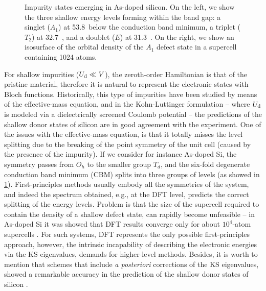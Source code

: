 \begin{figure}
    \centering
    \caption[]{Impurity states emerging in As-doped silicon. On the left, we show the three shallow energy levels forming within the band gap: a singlet ($A_1$) at 53.8~\mev below the conduction band minimum, a triplet ($T_2$) at 32.7~\mev, and a doublet ($E$) at 31.3~\mev. On the right, we show an isosurface of the orbital density of the $A_1$ defect state in a supercell containing 1024 atoms.}
    \label{fig:as-si-defect}
\end{figure}

For shallow impurities ($U_{\rm d} \ll V$), the zeroth-order Hamiltonian is that of the pristine material, therefore it is natural to represent the electronic states with Bloch functions. Historically, this type of impurities have been studied by means of the effective-mass equation, and in the Kohn-Luttinger formulation \cite{kohn_theory_1955} -- where $U_{\rm d}$ is modeled via a dielectrically screened Coulomb potential -- the predictions of the shallow donor states of silicon are in good agreement with the experiment. One of the issues with the effective-mass equation, is that it totally misses the level splitting due to the breaking of the point symmetry of the unit cell (caused by the presence of the impurity). If we consider for instance As-doped Si, the symmetry passes from $O_h$ to the smaller group $T_d$, and the six-fold degenerate conduction band minimum (CBM) splits into three groups of levels (as showed in \cref{fig:as-si-defect}). First-principles methods usually embody all the symmetries of the system, and indeed the spectrum obtained, e.g., at the DFT level, predicts the correct splitting of the energy levels. Problem is that the size of the supercell required to contain the density of a shallow defect state, can rapidly become unfeasible -- in As-doped Si it was showed that DFT results converge only for about $10^4$-atom supercells \cite{yamamoto_first-principles_2009}. For such systems, DFT represents the only possible first-principles approach, however, the intrinsic incapability of describing the electronic energies via the KS eigenvalues, demands for higher-level methods. Besides, it is worth to mention that schemes that include \emph{a posteriori} corrections of the KS eigenvalues, showed a remarkable accuracy in the prediction of the shallow donor states of silicon \cite{yamamoto_first-principles_2009,smith_ab_2017}.


